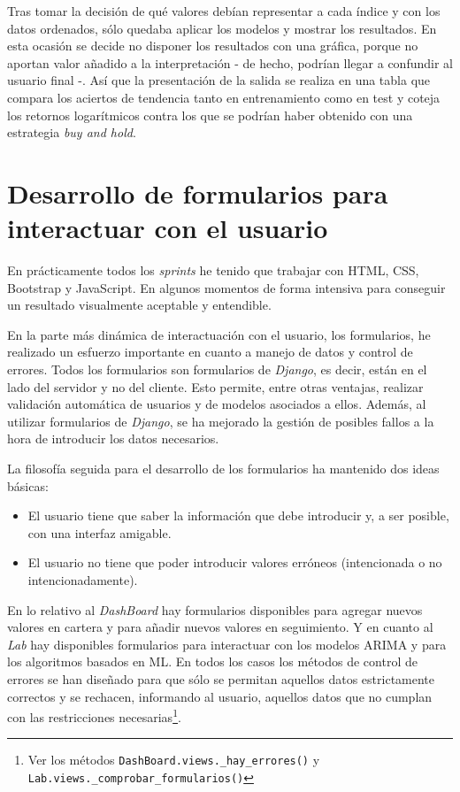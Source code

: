 Tras tomar la decisión de qué valores debían representar a cada índice y con los datos ordenados, sólo quedaba aplicar los modelos y mostrar los resultados. En esta ocasión se decide no disponer los resultados con una gráfica, porque no aportan valor añadido a la interpretación - de hecho, podrían llegar a confundir al usuario final -. Así que la presentación de la salida se realiza en una tabla que compara los aciertos de tendencia tanto en entrenamiento como en test y coteja los retornos logarítmicos contra los que se podrían haber obtenido con una estrategia \emph{buy and hold}. 




\section{Desarrollo de formularios para interactuar con el usuario}\label{desarrollo_formularios}

En prácticamente todos los \emph{sprints} he tenido que trabajar con HTML, CSS, Bootstrap y JavaScript. En algunos momentos de forma intensiva para conseguir un resultado visualmente aceptable y entendible. 

En la parte más dinámica de interactuación con el usuario, los formularios, he realizado un esfuerzo importante en cuanto a manejo de datos y control de errores. Todos los formularios son formularios de \emph{Django}, es decir, están en el lado del servidor y no del cliente. Esto permite, entre otras ventajas, realizar validación automática de usuarios y de modelos asociados a ellos. Además, al utilizar formularios de \emph{Django}, se ha mejorado la gestión de posibles fallos a la hora de introducir los datos necesarios. 

La filosofía seguida para el desarrollo de los formularios ha mantenido dos ideas básicas:

\begin{itemize}
\item
El usuario tiene que saber la información que debe introducir y, a ser posible, con una interfaz amigable. 
\item
El usuario no tiene que poder introducir valores erróneos (intencionada o no intencionadamente).
\end{itemize}

En lo relativo al \emph{DashBoard} hay formularios disponibles para agregar nuevos valores en cartera y para añadir nuevos valores en seguimiento. Y en cuanto al \emph{Lab} hay disponibles formularios para interactuar con los modelos ARIMA y para los algoritmos basados en ML. En todos los casos los métodos de control de errores se han diseñado para que sólo se permitan aquellos datos estrictamente correctos y se rechacen, informando al usuario, aquellos datos que no cumplan con las restricciones necesarias\footnote{Ver los métodos \texttt{DashBoard.views.\_hay\_errores()} y \texttt{Lab.views.\_comprobar\_formularios()}}.


